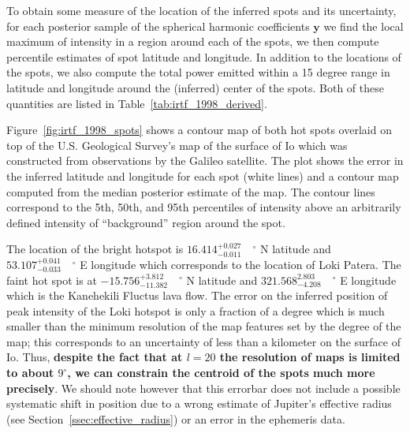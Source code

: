\documentclass[modern]{aastex62}
\begin{document}
To obtain some measure of the location of the inferred spots and its uncertainty, for each posterior sample of the spherical harmonic coefficients $\mathbf{y}$ we find the local maximum of intensity in a region around each of the spots, we then compute percentile estimates of spot latitude and longitude.
In addition to the locations of the spots, we also compute the total power emitted within a 15 degree range in latitude and longitude around the (inferred) center of the spots.
Both of these quantities are listed in Table~\ref{tab:irtf_1998_derived}. 

Figure~\ref{fig:irtf_1998_spots} shows  a contour map of both hot spots overlaid on top of the U.S. Geological Survey's map of the surface of Io \citep{williams2011} which was constructed from observations by the Galileo satellite.
The plot shows the error in the inferred latitude and longitude for each spot (white lines) and a contour map computed from the median posterior estimate of the map.
The contour lines correspond to the 5th, 50th, and 95th percentiles of intensity above an arbitrarily defined intensity of ``background'' region around the spot.

The location of the bright hotspot is $16.414_{-0.011}^{+0.027}\quad^\circ$ N latitude and $53.107_{-0.033}^{+0.041}\quad^\circ$ E longitude which corresponds to the location of Loki Patera.
The faint hot spot is at $-15.756_{-11.382}^{+3.812}\quad ^\circ$ N latitude and $321.568_{-4.208}^{2.803}\quad^\circ$ E longitude which is the Kanehekili Fluctus lava flow.
The error on the inferred position of peak intensity of the Loki hotspot is only a fraction of a degree which is much smaller than the minimum resolution of the map features set by the degree of the map; this corresponds to an uncertainty of less than a kilometer on the surface of Io.
Thus, \textbf{despite the fact that at $l=20$ the resolution of maps is limited to about $9^\circ$, we can constrain the centroid of the spots much more precisely}.
We should note however that this errorbar does not include a possible systematic shift in position due to a wrong estimate of Jupiter's effective radius (see Section~\ref{ssec:effective_radius}) or an error in the ephemeris data.
\end{document}
